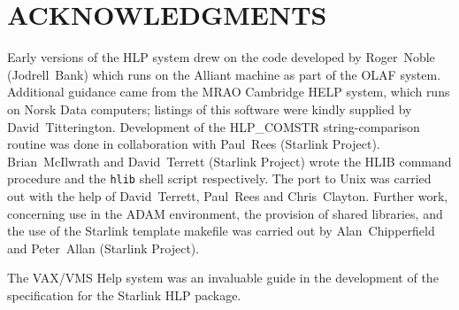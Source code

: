 \section{ACKNOWLEDGMENTS}
Early versions of the HLP system drew on the code developed by
Roger~Noble (Jodrell~Bank) which runs on the Alliant machine as part of
the OLAF system.  Additional guidance came from the MRAO Cambridge HELP
system, which runs on Norsk Data computers;  listings of this software
were kindly supplied by David~Titterington.  Development of the
HLP\_COMSTR string-comparison routine was done in collaboration with
Paul~Rees (Starlink Project).  Brian~McIlwrath and David~Terrett
(Starlink Project) wrote the HLIB command procedure and the {\tt hlib}
shell script respectively.  The port to Unix was carried out
with the help of David~Terrett, Paul~Rees and Chris~Clayton.  Further
work, concerning use in the ADAM environment, the provision
of shared libraries, and the use of the Starlink template makefile
was carried out by Alan~Chipperfield and Peter~Allan (Starlink
Project).

The VAX/VMS Help system was an invaluable guide in the development of
the specification for the Starlink HLP package.

